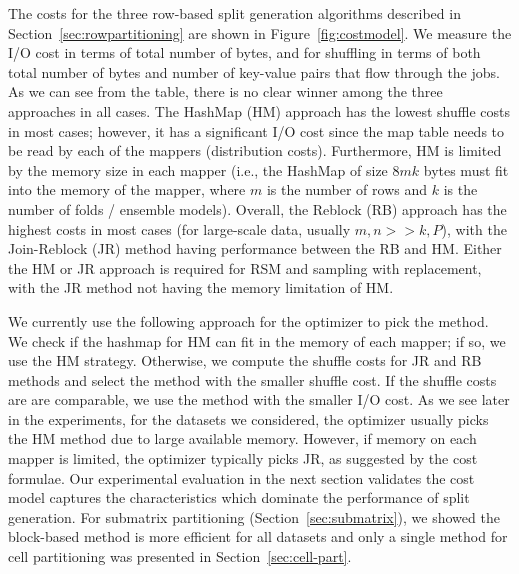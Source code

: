 \documentclass{vldb}
\begin{document}
The costs for the three row-based split generation algorithms described in
Section~\ref{sec:rowpartitioning} are shown in Figure~\ref{fig:costmodel}.
We measure the I/O cost in terms of total number of bytes,
and for shuffling in terms of both total number of bytes and number
of key-value pairs that flow through the jobs.
As we can see from the table, there is no clear winner among the three approaches in all cases.
The HashMap (HM) approach has the lowest shuffle costs in most cases; however,
it has a significant I/O cost since the map table needs to be read by each of
the mappers (distribution costs). Furthermore, HM is limited
by the memory size in each mapper (i.e., the HashMap of size $8mk$ bytes must fit into the memory of the mapper,
where $m$ is the number of rows and $k$ is the number of folds / ensemble models).
Overall, the Reblock (RB) approach has the highest costs in most cases (for large-scale data, usually
$m,n >> k, P$), with the Join-Reblock (JR) method having performance between the RB and HM.
Either the HM or JR approach is required for RSM and
sampling with replacement, with the JR method not having the memory limitation of HM.

We currently use the following approach for the optimizer to pick the method.
We check if the hashmap for HM can fit in the memory of each mapper; if so, we use the HM strategy.
Otherwise, we compute the shuffle costs for JR and RB methods and select the
method with the smaller shuffle cost. If the shuffle costs are are comparable,
we use the method with the smaller I/O cost. As we see later in the experiments,
for the datasets we considered, the optimizer usually picks the HM method due to large
available memory.
However, if memory on each mapper is limited, the optimizer typically picks JR,
as suggested by the cost formulae.
Our experimental evaluation in the next section validates the cost model captures
the characteristics which dominate the performance of split generation.
For submatrix partitioning (Section~\ref{sec:submatrix}), we showed the block-based method is more efficient for all datasets and
only a single method for cell partitioning was presented in Section~\ref{sec:cell-part}.
\end{document}
